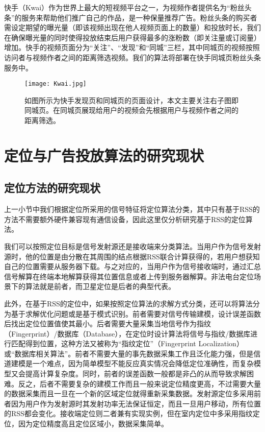 快手（Kwai）作为世界上最大的短视频平台之一，为视频作者提供名为“粉丝头条”的服务来帮助他们推广自己的作品，是一种保量推荐广告。粉丝头条的购买者需设定期望的曝光量（即该视频出现在他人视频页面上的数量）和投放时长，我们在确保曝光量的同时使得投放结束后用户获得最多的涨粉数（即关注量或订阅量）增加。快手的视频页面分为“关注”、“发现”和“同城”三栏，其中同城页的视频按照访问者与视频作者之间的距离筛选视频。我们的算法将部署在快手同城页粉丝头条服务中。

\begin{figure}[tb]
	\centering
	\texttt{[image: Kwai.jpg]}
	\caption{如图所示为快手发现页和同城页的页面设计，本文主要关注右子图即同城页。在同城页展现给用户的视频会先根据用户与视频作者之间的距离筛选。}
	\label{fig:kwai}
\end{figure}

\section{定位与广告投放算法的研究现状}
\label{sec:first}

\subsection{定位方法的研究现状}

上一小节中我们根据定位所采用的信号特征将定位算法分类，其中只有基于RSS的方法不需要额外硬件兼容现有通信设备，因此这里仅分析研究基于RSS的定位算法。

我们可以按照定位目标是信号发射源还是接收端来分类算法。当用户作为信号发射源时，他的位置是由分散在其周围的结点根据RSS联合计算获得的，若用户想获知自己的位置需要从服务器下载。与之对应的，当用户作为信号接收端时，通过汇总信号解算在终端本地解算获得其位置信息或者上传到服务器解算。非法电台定位场景下的算法就是前者，而卫星定位是后者的典型代表。

此外，在基于RSS的定位中，如果按照定位算法的求解方式分类，还可以将算法分为基于求解优化问题或是基于模式识别。前者需要对信号传输建模，设计误差函数后找出定位位置值使其最小。后者需要大量采集当地信号作为指纹（Fingerprint）/数据库（Database），在定位时设计算法将信号与指纹/数据库进行匹配得到位置，这种方法又被称为“指纹定位”（Fingerprint Localization）或“数据库相关算法”。前者不需要大量的事先数据采集工作且泛化能力强，但是信道建模是一个难点，因为简单模型不能反应真实情况会降低定位准确性，而复杂模型又会提高计算复杂度。同时，前者的误差函数一般都是非凸的从而导致求解困难。反之，后者不需要复杂的建模工作而且一般来说定位精度更高，不过需要大量的数据采集而且一旦在一个新的区域定位就得重新采集数据。发射源定位多采用前者因为用户作为发射源时其发射功率无法保证恒定，而且一旦用户移动，所有位置的RSS都会变化。接收端定位则二者兼有实现实例，但在室内定位中多采用指纹定位，因为定位精度高且定位区域小，数据采集简单。

